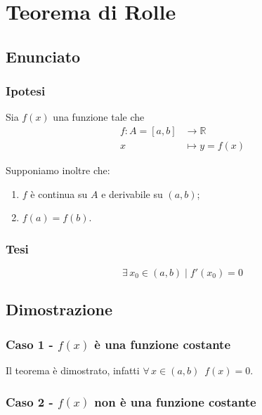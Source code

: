 \documentclass[../../dimostrazioni]{subfiles}
\begin{document}
    \chapter{Teorema di Rolle}
    \label{teoRolle}

        \section*{Enunciato}

            \subsection*{Ipotesi}

                Sia \(f(x)\) una funzione tale che
                \begin{align*}
                    f : A = [a, b] &\longrightarrow \mathbb{R}\\
                    x &\longmapsto y = f(x) 
                \end{align*}

                Supponiamo inoltre che:

                \begin{enumerate}
                    \indentitem \item \(f\) è continua su \(A\) e derivabile su \((a, b)\);
                    \indentitem \item \(f(a) = f(b)\).
                \end{enumerate}

            \subsection*{Tesi}

                \[\exists \, x_0 \in (a,b) \; | \; f'(x_0) = 0 \]

        \section*{Dimostrazione}

            \subsection*{Caso 1 - \(f(x)\) è una funzione costante}

            Il teorema è dimostrato, infatti \(\forall \, x \in (a,b) \, \, \, f(x) = 0\).

            \subsection*{Caso 2 - \(f(x)\) non è una funzione costante}
\end{document}
